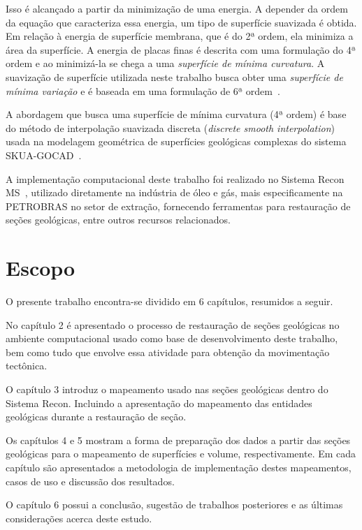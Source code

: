 Isso é alcançado a partir da minimização de uma energia. A depender da ordem da equação que caracteriza essa energia, um tipo de superfície suavizada é obtida. Em relação à energia de superfície membrana, que é do 2ª ordem, ela minimiza a área da superfície. A energia de placas finas é descrita com uma formulação do 4ª ordem e ao minimizá-la se chega a uma \emph{superfície de mínima curvatura}. A suavização de superfície utilizada neste trabalho busca obter uma \emph{superfície de mínima variação} e é baseada em uma formulação de 6ª ordem~\cite{Botsch}.

A abordagem que busca uma superfície de mínima curvatura (4ª ordem) é base do método de interpolação suavizada discreta (\emph{discrete smooth interpolation})~\cite{DSI} usada na modelagem geométrica de superfícies geológicas complexas do sistema SKUA-GOCAD~\cite{GOCAD}.

A implementação computacional deste trabalho foi realizado no Sistema Recon MS~\cite{ReconTecgraf}, utilizado diretamente na indústria de óleo e gás, mais especificamente na PETROBRAS no setor de extração, fornecendo ferramentas para restauração de seções geológicas, entre outros recursos relacionados.

\section{Escopo}

O presente trabalho encontra-se dividido em 6 capítulos, resumidos a seguir.

No capítulo 2 é apresentado o processo de restauração de seções geológicas no ambiente computacional usado como base de desenvolvimento deste trabalho, bem como tudo que envolve essa atividade para obtenção da movimentação tectônica.

O capítulo 3 introduz o mapeamento usado nas seções geológicas dentro do Sistema Recon. Incluindo a apresentação do mapeamento das entidades geológicas durante a restauração de seção.

Os capítulos 4 e 5 mostram a forma de preparação dos dados a partir das seções geológicas para o mapeamento de superfícies e volume, respectivamente. Em cada capítulo são apresentados a metodologia de implementação destes mapeamentos, casos de uso e discussão dos resultados.

O capítulo 6 possui a conclusão, sugestão de trabalhos posteriores e as últimas considerações acerca deste estudo.